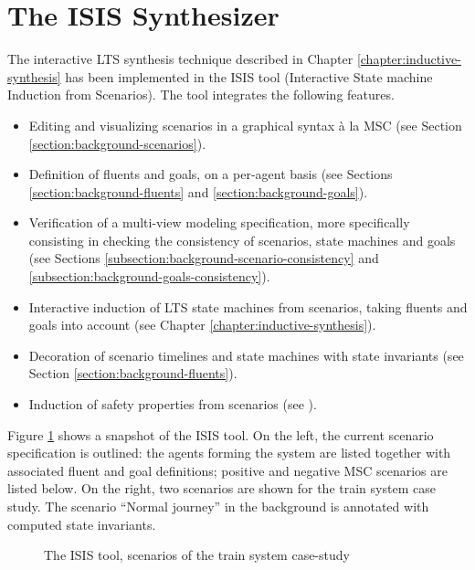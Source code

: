 \section{The ISIS Synthesizer\label{section:tool-support-isis}}

The interactive LTS synthesis technique described in Chapter \ref{chapter:inductive-synthesis} has been implemented in the ISIS tool (Interactive State machine Induction from Scenarios). The tool integrates the following features.

\begin{itemize}
\item Editing and visualizing scenarios in a graphical syntax \`a la MSC (see Section \ref{section:background-scenarios}).
\item Definition of fluents and goals, on a per-agent basis (see Sections \ref{section:background-fluents} and \ref{section:background-goals}).
\item Verification of a multi-view modeling specification, more specifically consisting in checking the consistency of scenarios, state machines and goals (see Sections \ref{subsection:background-scenario-consistency} and \ref{subsection:background-goals-consistency}).
\item Interactive induction of LTS state machines from scenarios, taking fluents and goals into account (see Chapter \ref{chapter:inductive-synthesis}).
\item Decoration of scenario timelines and state machines with state invariants (see Section \ref{section:background-fluents}).
\item Induction of safety properties from scenarios (see \cite{Damas:2011}).
\end{itemize}

Figure \ref{image:isis-tool} shows a snapshot of the ISIS tool. On the left, the current scenario specification is outlined: the agents forming the system are listed together with associated fluent and goal definitions; positive and negative MSC scenarios are listed below. On the right, two scenarios are shown for the train system case study. The scenario ``Normal journey'' in the background is annotated with computed state invariants.

\begin{figure}
\centering{}
  \caption{The ISIS tool, scenarios of the train system case-study\label{image:isis-tool}}
\end{figure}

